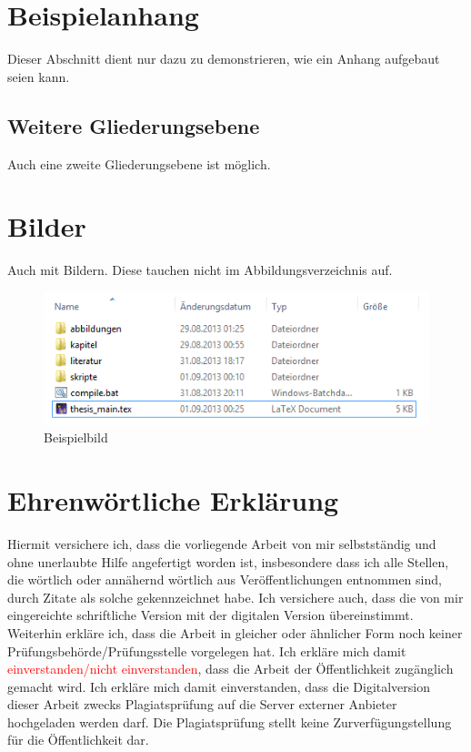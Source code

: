 \documentclass[12pt,oneside,titlepage]{scrartcl}
\begin{document}
		\begin{appendices}
				\renewcommand{\thesection}{Anhang \arabic{section}:}
				\renewcommand\thesubsection{Anhang \arabic{section}.\arabic{subsection}:}
	\section{Beispielanhang}\label{Beispielanhang}
			Dieser Abschnitt dient nur dazu zu demonstrieren, wie ein Anhang aufgebaut seien kann.
			\subsection{Weitere Gliederungsebene}
			Auch eine zweite Gliederungsebene ist möglich.
	\section{Bilder}
			Auch mit Bildern.
			Diese tauchen nicht im Abbildungsverzeichnis auf.
			\begin{figure}[H]
				\centering
				\caption[]{Beispielbild}
				\label{fig:Beispielbild}
				\includegraphics[width=1\textwidth]{verzeichnisStruktur}
			\end{figure}

		\end{appendices}

\newpage %
	\printbibliography[heading=bibintoc,title=Literaturverzeichnis]
	\newpage



\section*{Ehrenwörtliche Erklärung} %
	Hiermit versichere ich, dass die vorliegende Arbeit von mir selbstständig und ohne unerlaubte Hilfe angefertigt worden ist, insbesondere dass ich alle Stellen, die wörtlich oder annähernd wörtlich aus Veröffentlichungen entnommen sind, durch Zitate als solche gekennzeichnet habe. Ich versichere auch, dass die von mir eingereichte schriftliche Version mit der digitalen Version übereinstimmt. Weiterhin erkläre ich, dass die Arbeit in gleicher oder ähnlicher Form noch keiner Prüfungsbehörde/Prüfungsstelle vorgelegen hat. Ich erkläre mich damit \textcolor{red}{einverstanden/nicht einverstanden}, dass die Arbeit der Öffentlichkeit zugänglich gemacht wird. Ich erkläre mich damit einverstanden, dass die Digitalversion dieser Arbeit zwecks Plagiatsprüfung auf die Server externer Anbieter hochgeladen werden darf. Die Plagiatsprüfung stellt keine Zurverfügungstellung für die Öffentlichkeit dar.
\end{document}
